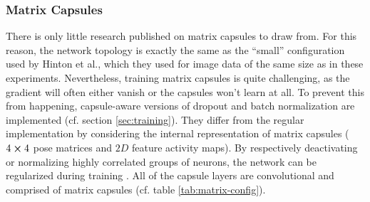 \subsubsection{Matrix Capsules}
There is only little research published on matrix capsules to draw from. For this reason, the network topology is exactly the same as the \enquote{small} configuration used by Hinton et al., which they used for image data of the same size as in these experiments. Nevertheless, training matrix capsules is quite challenging, as the gradient will often either vanish or the capsules won't learn at all. To prevent this from happening, capsule-aware versions of dropout and batch normalization are implemented (cf. section \ref{sec:training}). They differ from the regular implementation by considering the internal representation of matrix capsules ($4\cross 4$ pose matrices and $2D$ feature activity maps). By respectively deactivating or normalizing highly correlated groups of neurons, the network can be regularized during training \cite{hinton2012improving}. All of the capsule layers are convolutional and comprised of matrix capsules (cf. table \ref{tab:matrix-config}).
